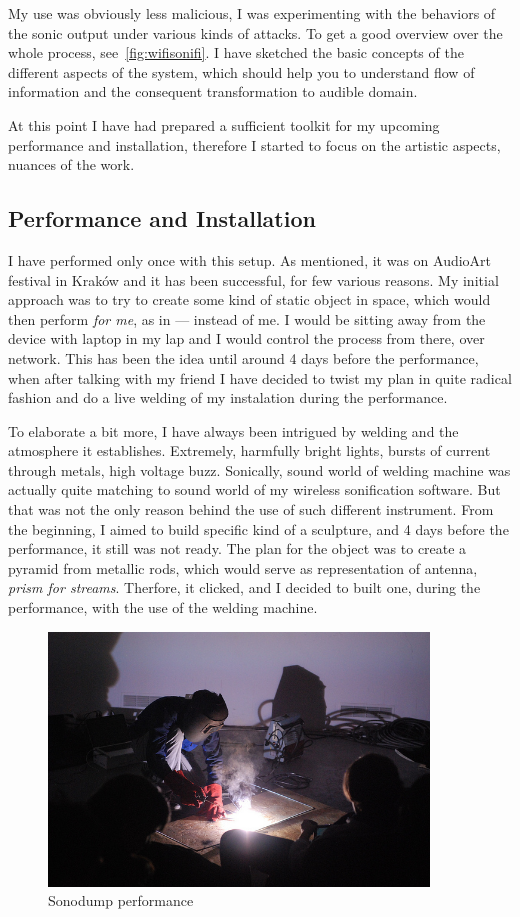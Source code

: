 \documentclass[12pt,a4paper,oneside]{report}
\begin{document}
My use was obviously less malicious, I was experimenting with the behaviors of the sonic output under various kinds of attacks. To get a good overview over the whole process, see~\ref{fig:wifisonifi}. I have sketched the basic concepts of the different aspects of the system, which should help you to understand flow of information and the consequent transformation to audible domain.

At this point I have had prepared a sufficient toolkit for my upcoming performance and installation, therefore I started to focus on the artistic aspects, nuances of the work.

\subsection{Performance and Installation}
I have performed only once with this setup. As mentioned, it was on AudioArt festival in Kraków and it has been successful, for few various reasons. My initial approach was to try to create some kind of static object in space, which would then perform \emph{for me}, as in --- instead of me. I would be sitting away from the device with laptop in my lap and I would control the process from there, over network. This has been the idea until around 4 days before the performance, when after talking with my friend I have decided to twist my plan in quite radical fashion and do a live welding of my instalation during the performance.

To elaborate a bit more, I have always been intrigued by welding and the atmosphere it establishes. Extremely, harmfully bright lights, bursts of current through metals, high voltage buzz. Sonically, sound world of welding machine was actually quite matching to sound world of my wireless sonification software. But that was not the only reason behind the use of such different instrument. From the beginning, I aimed to build specific kind of a sculpture, and 4 days before the performance, it still was not ready. The plan for the object was to create a pyramid from metallic rods, which would serve as representation of antenna, \textit{prism for streams}. Therfore, it clicked, and I decided to built one, during the performance, with the use of the welding machine.

\begin{figure}  
  \centering
    \includegraphics[width=0.9\textwidth]{img/zvarac}
	\caption{Sonodump performance}
	\label{fig:zvarac}
\end{figure}
\end{document}
